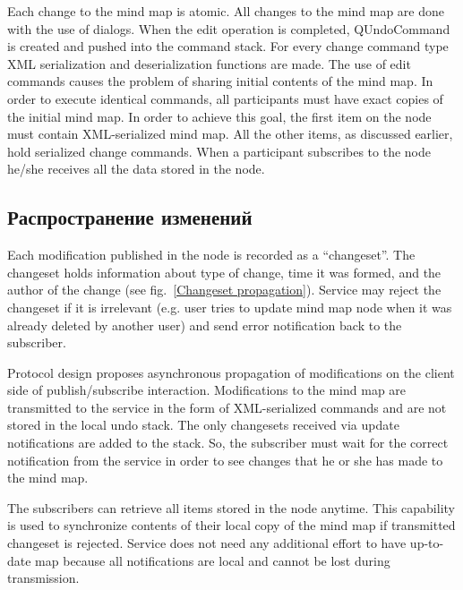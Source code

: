 Each change to the mind map is atomic. All changes to the mind map are done with
the use of dialogs. When the edit operation is completed, QUndoCommand is
created and pushed into the command stack. For every change command type XML
serialization and deserialization functions are made.  The use of edit commands
causes the problem of sharing initial contents of the mind map. In order to
execute identical commands, all participants must have exact copies of the
initial mind map. In order to achieve this goal, the first item on the node must
contain XML-serialized mind map. All the other items, as discussed earlier, hold
serialized change commands.  When a participant subscribes to the node he/she
receives all the data stored in the node.

\subsection{Распространение изменений}

Each modification published in the node is recorded as a ``changeset''. The
changeset holds information about type of change, time it was formed, and the
author of the change (see fig.~\ref{Changeset propagation}). Service may reject
the changeset if it is irrelevant (e.g. user tries to update mind map node when
it was already deleted by another user) and send error notification back to the
subscriber.


Protocol design proposes asynchronous propagation of modifications on the client
side of publish/subscribe interaction. Modifications to the mind map are
transmitted to the service in the form of XML-serialized commands and are not
stored in the local undo stack. The only changesets received via update
notifications are added to the stack. So, the subscriber must wait for the
correct notification from the service in order to see changes that he or she has
made to the mind map.

The subscribers can retrieve all items stored in the node anytime. This
capability is used to synchronize contents of their local copy of the mind map
if transmitted changeset is rejected. Service does not need any additional
effort to have up-to-date map because all notifications are local and cannot be
lost during transmission.

